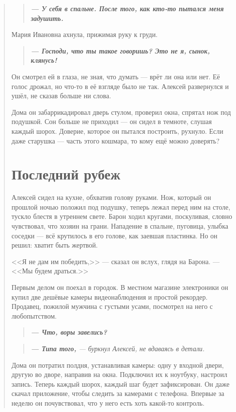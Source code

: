 \documentclass[12pt,a4paper]{book}
\newenvironment{dialogue}{\begin{quote}\itshape}{\end{quote}}
\begin{document}
\begin{dialogue}
\begin{dialogue}
\textbf{--- У себя в спальне. После того, как кто-то пытался меня задушить.}
\end{dialogue}

Мария Ивановна ахнула, прижимая руку к груди.

\begin{dialogue}
\textbf{--- Господи, что ты такое говоришь? Это не я, сынок, клянусь!}
\end{dialogue}

Он смотрел ей в глаза, не зная, что думать --- врёт ли она или нет. Её голос дрожал, но что-то в её взгляде было не так. Алексей развернулся и ушёл, не сказав больше ни слова.

Дома он забаррикадировал дверь стулом, проверил окна, спрятал нож под подушкой. Сон больше не приходил --- он сидел в темноте, слушая каждый шорох. Доверие, которое он пытался построить, рухнуло. Если даже старушка --- часть этого кошмара, то кому ещё можно доверять?

\chapter{Последний рубеж}

Алексей сидел на кухне, обхватив голову руками. Нож, который он прошлой ночью положил под подушку, теперь лежал перед ним на столе, тускло блестя в утреннем свете. Барон ходил кругами, поскуливая, словно чувствовал, что хозяин на грани. Нападение в спальне, пуговица, улыбка соседки --- всё крутилось в его голове, как заевшая пластинка. Но он решил: хватит быть жертвой.

<<Я не дам им победить,>> --- сказал он вслух, глядя на Барона. --- <<Мы будем драться.>>

Первым делом он поехал в городок. В местном магазине электроники он купил две дешёвые камеры видеонаблюдения и простой рекордер. Продавец, пожилой мужчина с густыми усами, посмотрел на него с любопытством.

\begin{dialogue}
\textbf{--- Что, воры завелись?}
\end{dialogue}

\begin{dialogue}
\textbf{--- Типа того,} --- буркнул Алексей, не вдаваясь в детали.
\end{dialogue}

Дома он потратил полдня, устанавливая камеры: одну у входной двери, другую во дворе, направив на окна. Подключил их к ноутбуку, настроил запись. Теперь каждый шорох, каждый шаг будет зафиксирован. Он даже скачал приложение, чтобы следить за камерами с телефона. Впервые за неделю он почувствовал, что у него есть хоть какой-то контроль.


\end{dialogue}
\end{document}
